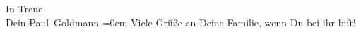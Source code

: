\pstart
           In Treue {\\[\baselineskip]}Dein \spacefill\mbox{Paul Goldmann}\pend
           \leftskip=0em{}
\pstart
           \noindent{}{\pb}Viele Grüße an Deine Familie, wenn Du bei ihr
                  biſt!\pend
           \endnumbering{}  \newcommand{\dateiname}{L02881}\newcommand{\titel}{Paul Goldmann an Arthur Schnitzler, 27. 7. [1899]}\newcommand{\editorInnen}{Martin Anton Müller und Laura Untner}
